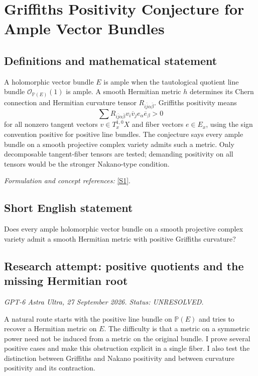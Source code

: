 \documentclass[11pt]{article}
\begin{document}
\section*{\texorpdfstring{Griffiths Positivity Conjecture for Ample Vector Bundles}{Griffiths Positivity Conjecture for Ample Vector Bundles}}\label{30006840}
\subsection{Definitions and mathematical statement}
A holomorphic vector bundle $E$ is ample when the tautological quotient line bundle $\mathcal O_{{\mathbb{P}}(E)}(1)$ is ample. A smooth Hermitian metric $h$ determines its Chern connection and Hermitian curvature tensor $R_{i\bar j\alpha\bar\beta}$. Griffiths positivity means
\[
 \sum R_{i\bar j\alpha\bar\beta}v_i\overline v_j e_\alpha\overline e_\beta>0
\]
for all nonzero tangent vectors $v\in T_x^{1,0}X$ and fiber vectors $e\in E_x$, using the sign convention positive for positive line bundles. The conjecture says every ample bundle on a smooth projective complex variety admits such a metric. Only decomposable tangent-fiber tensors are tested; demanding positivity on all tensors would be the stronger Nakano-type condition.
\par\smallskip\textit{Formulation and concept references:} \href{https://arxiv.org/abs/2002.02677}{[S1]}.

\subsection{Short English statement}
Does every ample holomorphic vector bundle on a smooth projective complex variety admit a smooth Hermitian metric with positive Griffiths curvature?
\subsection{Research attempt: positive quotients and the missing Hermitian root}
\textit{GPT-6 Astra Ultra, 27 September 2026. Status: UNRESOLVED.}

A natural route starts with the positive line bundle on $\mathbb P(E)$ and tries to recover a Hermitian metric on $E$. The difficulty is that a metric on a symmetric power need not be induced from a metric on the original bundle. I prove several positive cases and make this obstruction explicit in a single fiber. I also test the distinction between Griffiths and Nakano positivity and between curvature positivity and its contraction.
\end{document}
